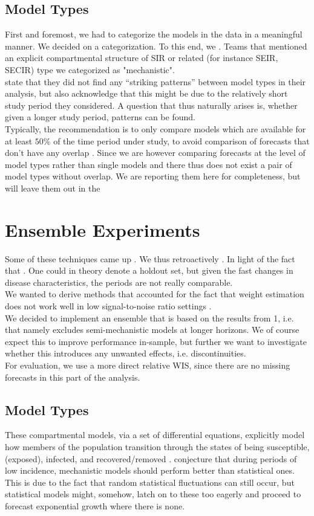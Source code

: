 \subsection{Model Types}
First and foremost, we had to categorize the models in the data in a meaningful manner. We decided on a categorization. To this end, we . Teams that mentioned an explicit compartmental structure of SIR or related (for instance SEIR, SECIR) type we categorized as "mechanistic".\\
\citep{bracher_evaluating_2021} state that they did not find any ``striking patterns'' between model types in their analysis, but also acknowledge that this might be due to the relatively short study period they considered. A question that thus naturally arises is, whether given a longer study period, patterns can be found.\\
Typically, the recommendation is to only compare models which are available for at least $50\% $ of the time period under study, to avoid comparison of forecasts that don't have any overlap \citep{bosse_epiforecastsscoringutils_2022}. Since we are however comparing forecasts at the level of model types rather than single models and there thus does not exist a pair of model types without overlap. We are reporting them here for completeness, but will leave them out in the 
\section{Ensemble Experiments}
Some of these techniques came up . We thus retroactively . In light of the fact that . One could in theory denote a holdout set, but given the fast changes in disease characteristics, the periods are not really comparable.\\ 
We wanted to derive methods that accounted for the fact that weight estimation does not work well in low signal-to-noise ratio settings \cite{claeskens_forecast_2016}.\\
We decided to implement an ensemble that is based on the results from 1, i.e. that namely excludes semi-mechanistic models at longer horizons. We of course expect this to improve performance in-sample, but further we want to investigate whether this introduces any unwanted effects, i.e. discontinuities.\\
For evaluation, we use a more direct relative WIS, since there are no missing forecasts in this part of the analysis.
\subsection{Model Types}
These compartmental models, via a set of differential equations, explicitly model how members of the population transition through the states of being susceptible, (exposed), infected, and recovered/removed \cite{taylor_combining_2021}.
\cite{taylor_combining_2021} conjecture that during periods of low incidence, mechanistic models should perform better than statistical ones. This is due to the fact that random statistical fluctuations can still occur, but statistical models might, somehow, latch on to these too eagerly and proceed to forecast exponential growth where there is none.
